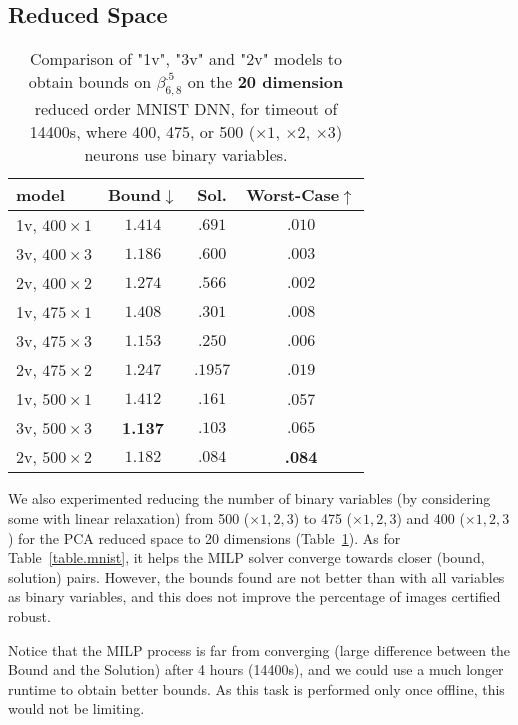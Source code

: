 \subsection{Reduced Space}

\begin{table}[h!]
	\centering
	\begin{tabular}{||l||c|c|c||}\hline\hline
		model &        Bound$\downarrow$ &  Sol. &      Worst-Case$\uparrow$ \\\hline \hline
1v, $400 \times 1$ & $1.414$ &  $.691$ & $.010$ \\\hline 
3v, $400 \times 3$ & $1.186$ & $.600$ & $.003$ \\\hline 
2v, $400 \times 2$ & $1.274$ & $.566$ & $.002$ \\\hline\hline
	 
1v, $475 \times 1$ &  $1.408$ & $.301$ & $.008$  \\\hline 
3v, $475 \times 3$ &  $1.153$ & $.250$ & $.006$ \\ \hline 
2v, $475 \times 2$ &  $1.247$ & $.1957$ & $.019$ \\\hline\hline

1v, $500 \times 1$ & $1.412$ & $.161$ & .057 \\\hline 
3v, $500 \times 3$ & {\bf 1.137} & $.103$ & $.065$\\\hline 
2v, $500 \times 2$ &  $1.182$ & $.084$& {\bf .084}  \\\hline\hline
	 
	\end{tabular}
	\caption{Comparison of "1v", "3v" and "2v" models 
	to obtain bounds on $\beta^{.5}_{6,8}$ on the {\bf 20 dimension} reduced order MNIST DNN, for timeout of 14400s, 
	where 400, 475,  or 500 ($\times 1$, $\times 2$, $\times 3$) neurons use binary variables.}
	\label{table.reduced}
\end{table}


We also experimented reducing the number of binary variables (by considering some with linear relaxation) from 500 ($\times 1,2,3$) to 475 ($\times 1,2,3$) and 400 ($\times 1,2,3$) for the PCA reduced space to 20 dimensions (Table~\ref{table.reduced}). 
As for Table~\ref{table.mnist}, it helps the MILP solver converge towards closer (bound, solution) pairs. However, the bounds found are not better than with all variables as binary variables, and this does not improve the percentage of images certified robust.


Notice that the MILP process is far from converging (large difference between the Bound and the Solution) after 4 hours (14400s), and we could use a much longer 
runtime to obtain better bounds. As this task is performed only once offline, this would not be limiting.


